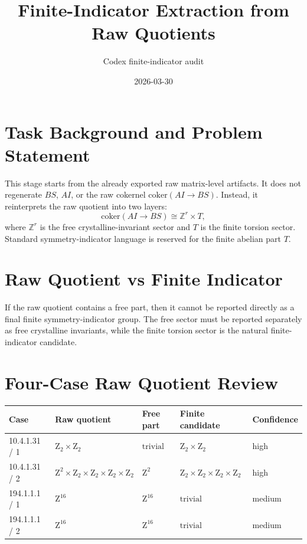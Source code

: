 \documentclass[11pt]{article}
\title{Finite-Indicator Extraction from Raw Quotients}
\author{Codex finite-indicator audit}
\date{2026-03-30}
\begin{document}
        \maketitle

        \section{Task Background and Problem Statement}
        This stage starts from the already exported raw matrix-level artifacts.  It does not regenerate
        $BS$, $AI$, or the raw cokernel $\mathrm{coker}(AI \to BS)$.  Instead, it reinterprets the raw quotient
        into two layers:
        \[
          \mathrm{coker}(AI \to BS) \cong \mathbb{Z}^r \times T,
        \]
        where $\mathbb{Z}^r$ is the free crystalline-invariant sector and $T$ is the finite torsion sector.
        Standard symmetry-indicator language is reserved for the finite abelian part $T$.

        \section{Raw Quotient vs Finite Indicator}
        If the raw quotient contains a free part, then it cannot be reported directly as a final finite symmetry-indicator group.
        The free sector must be reported separately as free crystalline invariants, while the finite torsion sector is the natural finite-indicator candidate.

        \section{Four-Case Raw Quotient Review}
        \begin{center}
        \begin{tabular}{lllll}
        \toprule
        Case & Raw quotient & Free part & Finite candidate & Confidence \\
        \midrule
        10.4.1.31 / 1 & $\mathrm{Z}_{2} \times \mathrm{Z}_{2}$ & $\mathrm{trivial}$ & $\mathrm{Z}_{2} \times \mathrm{Z}_{2}$ & high \\
10.4.1.31 / 2 & $\mathrm{Z}^{2} \times \mathrm{Z}_{2} \times \mathrm{Z}_{2} \times \mathrm{Z}_{2} \times \mathrm{Z}_{2}$ & $\mathrm{Z}^{2}$ & $\mathrm{Z}_{2} \times \mathrm{Z}_{2} \times \mathrm{Z}_{2} \times \mathrm{Z}_{2}$ & high \\
194.1.1.1 / 1 & $\mathrm{Z}^{16}$ & $\mathrm{Z}^{16}$ & $\mathrm{trivial}$ & medium \\
194.1.1.1 / 2 & $\mathrm{Z}^{16}$ & $\mathrm{Z}^{16}$ & $\mathrm{trivial}$ & medium \\
        \bottomrule
        \end{tabular}
        \end{center}
\end{document}

